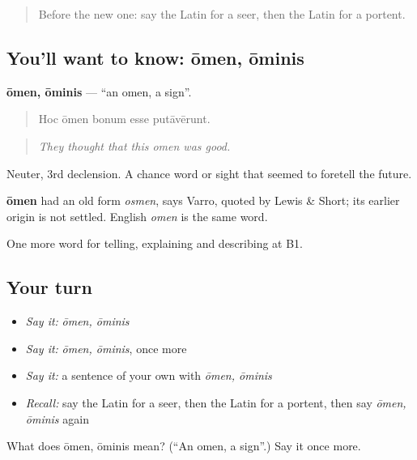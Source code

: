 \begin{quote}
Before the new one: say the Latin for a seer, then the Latin for a portent.
\end{quote}

\subsection*{You'll want to know: ōmen, ōminis}
\textbf{ōmen, ōminis} — \textquotedblleft{}an omen, a sign\textquotedblright{}.

\begin{quote}
Hoc ōmen bonum esse putāvērunt.
\end{quote}

\begin{quote}
\emph{They thought that this omen was good.}
\end{quote}

Neuter, 3rd declension. A chance word or sight that seemed to foretell the future.

\begin{cousinweb}
\textbf{ōmen} had an old form \emph{osmen}, says Varro, quoted by Lewis \& Short; its earlier origin is not settled. English \emph{omen} is the same word.
\end{cousinweb}

\begin{grammarlens}[title={What you've built}]
One more word for telling, explaining and describing at B1.
\end{grammarlens}

\subsection*{Your turn}
\begin{itemize}
\raggedright
  \item \emph{Say it:} \emph{ōmen, ōminis}
  \item \emph{Say it:} \emph{ōmen, ōminis}, once more
  \item \emph{Say it:} a sentence of your own with \emph{ōmen, ōminis}
  \item \emph{Recall:} say the Latin for a seer, then the Latin for a portent, then say \emph{ōmen, ōminis} again
\end{itemize}

\begin{tcolorbox}[breakable,colback=teal!4,colframe=teal!35!black,title={Before you move on}]
What does ōmen, ōminis mean? (\textquotedblleft{}An omen, a sign\textquotedblright{}.) Say it once more.
\end{tcolorbox}
